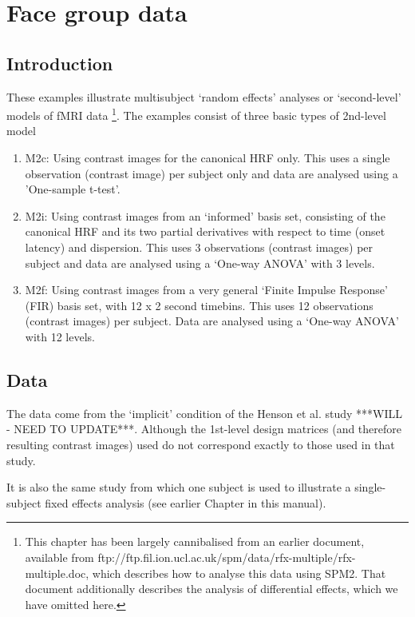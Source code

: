 \documentclass[a4paper,titlepage]{book}
\begin{document}
\chapter{Face group data}

\section{Introduction}

These examples illustrate multisubject `random effects' analyses or `second-level' models of fMRI data \cite{will_hbf2_rfx}\footnote{This chapter has been largely cannibalised from an earlier document, available from {\sf ftp://ftp.fil.ion.ucl.ac.uk/spm/data/rfx-multiple/rfx-multiple.doc}, which describes how to analyse this data using SPM2. 
That document additionally describes the analysis of differential effects, which we have omitted here.  }. 
The examples consist of three basic types of 2nd-level model
\begin{enumerate}
\item{M2c: Using contrast images for the canonical HRF only. This uses a single observation (contrast image) per subject only and data are 
analysed using a 'One-sample t-test'.}
\item{M2i: Using contrast images from an `informed' basis set, consisting of the canonical HRF and its two partial derivatives with respect to time (onset latency) and dispersion. This uses
3 observations (contrast images) per subject and data are 
analysed using a `One-way ANOVA' with 3 levels.}
\item{M2f: Using contrast images from a very general `Finite Impulse Response' (FIR) basis set, with 12 x 2 second timebins. This 
uses 12 observations (contrast images) per subject. Data are 
analysed using a `One-way ANOVA' with 12 levels.}
\end{enumerate}

\section{Data}

The data come from the `implicit' condition of the Henson 
et al. study \cite{rik_face_rep} ***WILL - NEED TO UPDATE***. Although the 1st-level design matrices (and therefore resulting contrast images) used do not correspond exactly to those used in that study.

It is also the same study from which one subject is used to illustrate a single-subject fixed effects analysis (see earlier Chapter in this manual).
\end{document}
